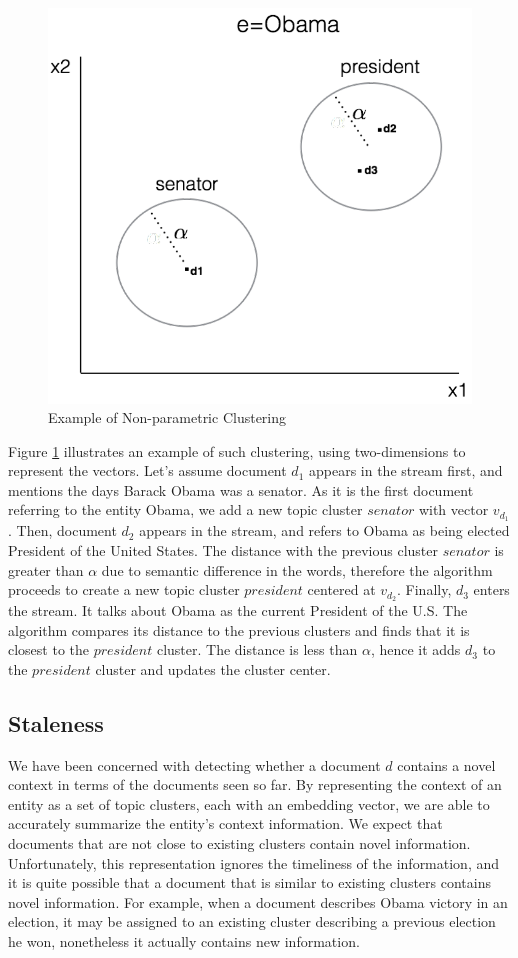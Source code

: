 \documentclass{article}
\begin{document}
\begin{figure}[tb]
\centering
\includegraphics[width=0.7\columnwidth]{fig/obamaExample.pdf}
\caption{Example of Non-parametric Clustering}
\label{obama}
\end{figure}

Figure \ref{obama} illustrates an example of such clustering, using two-dimensions to represent the vectors.
Let's assume document $d_1$ appears in the stream first, and mentions the days Barack Obama was a senator. As it is the first document referring to the entity Obama, we add a new topic cluster $senator$ with vector $v_{d_1}$. 
Then, document $d_2$ appears in the stream, and refers to Obama as being elected President of the United States.
The distance with the previous cluster $senator$ is greater than $\alpha$ due to semantic difference in the words, therefore the algorithm proceeds to create a new topic cluster $president$ centered at $v_{d_2}$. 
Finally, $d_3$ enters the stream. 
It talks about Obama as the current President of the U.S. 
The algorithm compares its distance to the previous clusters and finds that it is closest to the $president$ cluster. 
The distance is less than $\alpha$, hence it adds $d_3$ to the $president$ cluster and updates the cluster center. 

\subsection{Staleness}
\label{staleness}

We have been concerned with detecting whether a document $d$ contains a novel context in terms of the documents seen so far.
By representing the context of an entity as a set of topic clusters, each with an embedding vector, we are able to accurately summarize the entity's context information. We expect that documents that are not close to existing clusters contain novel information.
Unfortunately, this representation ignores the timeliness of the information, and it is quite possible that a document that is similar to existing clusters contains novel information.
For example, when a document describes Obama victory in an election, it may be assigned to an existing cluster describing a previous election he won, nonetheless it actually contains new information.
\end{document}
